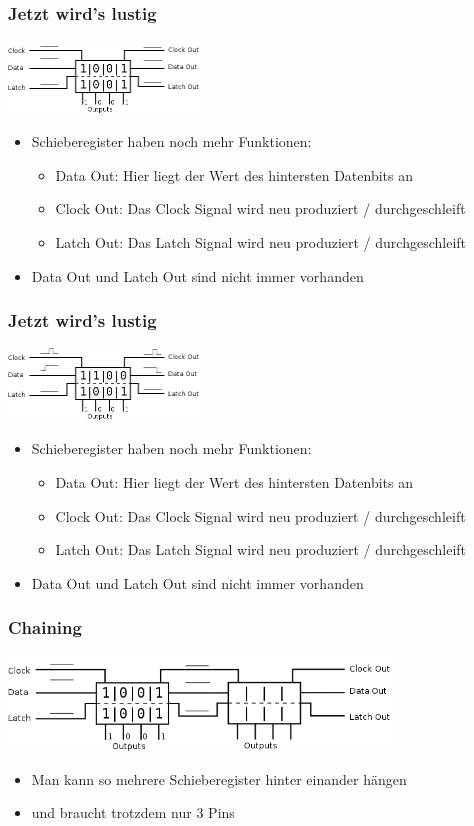 \documentclass[ngerman,compress]{beamer}
\begin{document}
\begin{frame} [fragile]
	\frametitle{Jetzt wird's lustig}
	\includegraphics[width=2in]{08_outs.png}
	\pause
	\begin{itemize}
		\item Schieberegister haben noch mehr Funktionen:
		\begin{itemize}
			\item Data Out: Hier liegt der Wert des hintersten Datenbits an
			\item Clock Out: Das Clock Signal wird neu produziert / durchgeschleift
			\item Latch Out: Das Latch Signal wird neu produziert / durchgeschleift
		\end{itemize}
		\pause
		\item Data Out und Latch Out sind nicht immer vorhanden
	\end{itemize}
\end{frame}

\begin{frame} [fragile]
	\frametitle{Jetzt wird's lustig}
	\includegraphics[width=2in]{09_shift.png}
	\begin{itemize}
		\item Schieberegister haben noch mehr Funktionen:
		\begin{itemize}
			\item Data Out: Hier liegt der Wert des hintersten Datenbits an
			\item Clock Out: Das Clock Signal wird neu produziert / durchgeschleift
			\item Latch Out: Das Latch Signal wird neu produziert / durchgeschleift
		\end{itemize}
		\item Data Out und Latch Out sind nicht immer vorhanden
	\end{itemize}
\end{frame}

\begin{frame} [fragile]
	\frametitle{Chaining}
	\includegraphics[width=4in]{10_chaining.png}
	\pause
	\begin{itemize}
		\item Man kann so mehrere Schieberegister hinter einander hängen
                \item und braucht trotzdem nur 3 Pins
	\end{itemize}
\end{frame}
\end{document}
